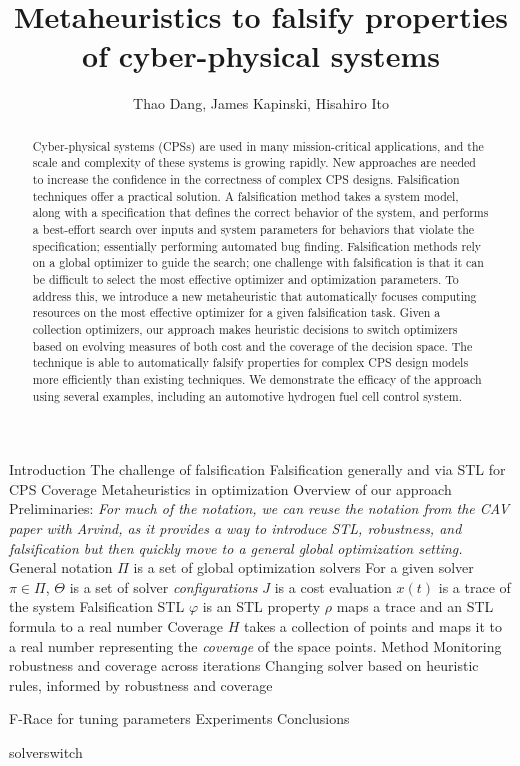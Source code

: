 \documentclass[10pt,oneside,letterpaper]{article}
\title{Metaheuristics to falsify properties of cyber-physical systems}
\author{Thao Dang, James Kapinski, Hisahiro Ito}
\date{}
\begin{document}
\maketitle

\begin{abstract}
Cyber-physical systems (CPSs) are used in many mission-critical applications, and the scale and complexity of these systems is growing rapidly.
New approaches are needed to increase the confidence in the correctness of complex CPS designs.
Falsification techniques offer a practical solution. 
A falsification method takes a system model, along with a specification that defines the correct behavior of the system, and performs a best-effort search over inputs and system parameters for behaviors that violate the specification; essentially performing automated bug finding.
Falsification methods rely on a global optimizer to guide the search; one challenge with falsification is that it can be difficult to select the most effective optimizer and optimization parameters.
To address this, we introduce a new metaheuristic that automatically focuses computing resources on the most effective optimizer for a given falsification task.
Given a collection optimizers, our approach makes heuristic decisions to switch optimizers based on
evolving measures of both cost and the coverage of the decision space.
The technique is able to automatically falsify properties for complex CPS design models more efficiently than existing techniques.
We demonstrate the efficacy of the approach using several examples, including an automotive hydrogen fuel cell control system.

\end{abstract}

\begin{outline}[enumerate]
\1 Introduction
	\2 The challenge of falsification
	\2 Falsification generally and via STL for CPS
	\2 Coverage
	\2 Metaheuristics in optimization
	\2 Overview of our approach
\1 Preliminaries: \emph{For much of the notation, we can reuse the notation from the CAV paper with Arvind, as it provides a way to introduce STL, robustness, and falsification but then quickly move to a general global optimization setting.}
	\2 General notation
		\3 $\Pi$ is a set of global optimization solvers
		\3 For a given solver $\pi\in \Pi$, $\Theta$ is a set of solver \emph{configurations}
		\3 $J$ is a cost evaluation
		\3 $x(t)$ is a trace of the system
	\2 Falsification
	\2 STL
		\3 $\varphi$ is an STL property 
		\3 $\rho$ maps a trace and an STL formula to a real number
	\2 Coverage
		\3 $H$ takes a collection of points and maps it to a real number representing the \emph{coverage} of the space points.
\1 Method
	\2 Monitoring robustness and coverage across iterations
	\2 Changing solver based on heuristic rules, informed by robustness and coverage
	
	
	
	\2 F-Race for tuning parameters
\1 Experiments
\1 Conclusions
\end{outline}


 {solverswitch}
\end{document}
